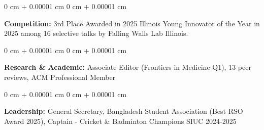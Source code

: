 \documentclass[10pt, letterpaper]{article}
\newenvironment{onecolentry}{
    \begin{adjustwidth}{
        0 cm + 0.00001 cm
    }{
        0 cm + 0.00001 cm
    }
}{
    \end{adjustwidth}
} %
\begin{document}
        \begin{onecolentry}
            \textbf{Competition:} 3rd Place Awarded in 2025 Illinois Young Innovator of the Year in 2025 among 16 selective talks by Falling Walls Lab Illinois.
        \end{onecolentry}

          \begin{onecolentry}
            \textbf{Research \& Academic:} Associate Editor (Frontiers in Medicine Q1), 13 peer reviews, ACM Professional Member
        \end{onecolentry}

        \vspace{0.1 cm}

        \begin{onecolentry}
            \textbf{Leadership:} General Secretary,  Bangladesh Student Association (Best RSO Award 2025), Captain - Cricket \& Badminton Champions SIUC 2024-2025
        \end{onecolentry}
\end{document}
